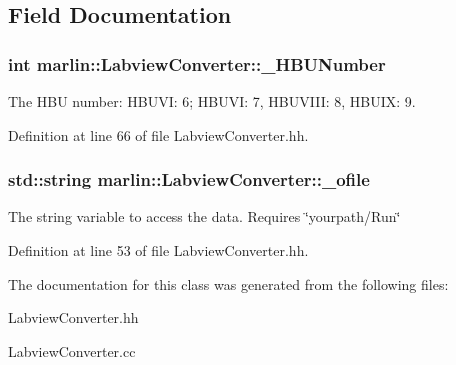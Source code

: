 \subsection{Field Documentation}
\subsubsection[{\_\-HBUNumber}]{\setlength{\rightskip}{0pt plus 5cm}int {\bf marlin::LabviewConverter::\_\-HBUNumber}\hspace{0.3cm}{\ttfamily  [protected]}}\label{classmarlin_1_1LabviewConverter_af4d39fa4509ab8f4c3a8e074ab6a5140}


The HBU number: HBUVI: 6; HBUVI: 7, HBUVIII: 8, HBUIX: 9. 

Definition at line 66 of file LabviewConverter.hh.
\subsubsection[{\_\-ofile}]{\setlength{\rightskip}{0pt plus 5cm}std::string {\bf marlin::LabviewConverter::\_\-ofile}\hspace{0.3cm}{\ttfamily  [protected]}}\label{classmarlin_1_1LabviewConverter_aae187f85848e953e0a1bb84763c9d817}


The string variable to access the data. Requires \char`\"{}yourpath/Run\char`\"{} 

Definition at line 53 of file LabviewConverter.hh.

The documentation for this class was generated from the following files:\begin{DoxyCompactItemize}
\item 
LabviewConverter.hh\item 
LabviewConverter.cc\end{DoxyCompactItemize}
